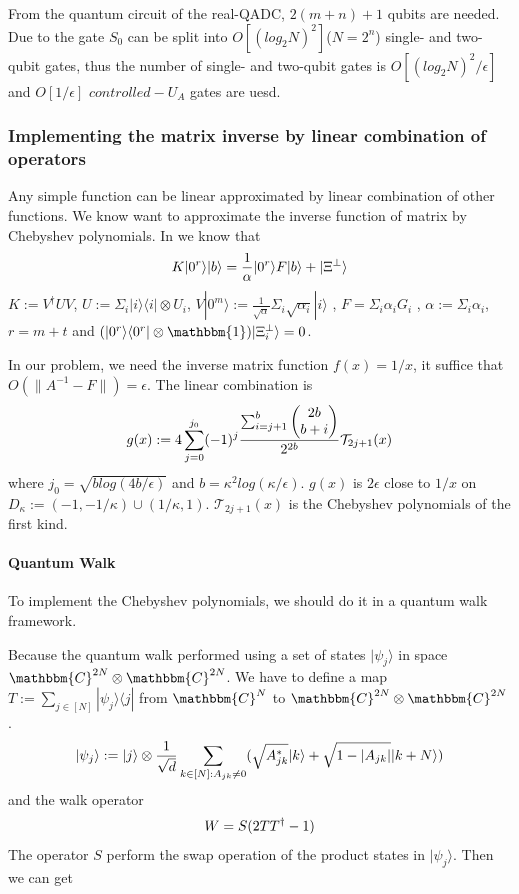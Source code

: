 \documentclass[%
 reprint,
 amsmath,amssymb,
pra,
]{revtex4-1}
\begin{document}
From the quantum circuit of the real-QADC, $2(m+n)+1$ qubits are needed. Due to the gate $S_0$ can be split into $O[(log_{2}N)^2]$($N=2^n$) 
single- and two-qubit gates\cite{barenco_elementary_1995}, thus the number of single- and two-qubit gates is $O[(log_{2}N)^2/{\epsilon}]$ and $O[1/{\epsilon}]$ $controlled-U_A$ gates are uesd\cite{mitarai_quantum_2019}.


\subsubsection{Implementing the matrix inverse by linear combination of operators}
Any simple function can be linear approximated by linear combination of other
functions. We know want to approximate the inverse function of matrix by
Chebyshev polynomials. In \cite{doi:10.1137/16M1087072} we know that 
\begin{equation}
\label{K}
K|0^r\rangle|b\rangle=\frac{1}{\alpha}|0^r\rangle F|b\rangle
+|\Xi^\bot \rangle\notag
\end{equation}
$K:=V^\dagger UV$, $U:=\Sigma_i|i\rangle\langle i|
\otimes U_i$, 
$V|0^m\rangle:=\frac{1}{\sqrt{\alpha}}\Sigma_i\sqrt{\alpha_i}|i\rangle$
, $F=\Sigma_i\alpha_iG_i$
, $\alpha:=\Sigma_i\alpha_i$, $r=m+t$ and 
$(|0^r\rangle\langle0^r|\otimes\mathbbm{1})|\Xi_i^\bot\rangle=0$.

In our problem, we need the inverse matrix function $f(x) = 1/x$, 
it suffice that $O(\lVert A^{-1}-F\rVert)=\epsilon$.
The linear combination\cite{doi:10.1137/16M1087072} is
\begin{equation}
g(x):=4\sum_{j=0}^{j_0}(-1)^j
\frac{\sum_{i=j+1}^{b}\begin{pmatrix}
2b\\b+i
\end{pmatrix}}{2^{2b}}\mathcal{T}_{2j+1}(x)\notag
\end{equation}
where $j_0=\sqrt{b log(4b/\epsilon)}$ and $b=\kappa^2log(\kappa/\epsilon)$.
$g(x)$ is $2\epsilon$ close to $1/x$ on $D_\kappa:=(-1,-1/\kappa)\cup
(1/\kappa,1)$.
$\mathcal{T}_{2j+1}(x)$ is the Chebyshev polynomials of the first kind.
\paragraph{Quantum Walk}
To implement the Chebyshev polynomials, we should do it in a quantum walk 
framework. 

Because the quantum walk performed using a set of states $|\psi_j\rangle$
in space $\mathbbm{C}^{2N}\otimes
\mathbbm{C}^{2N}$.
We have to define a map $T:=\sum_{j\in [N]}|\psi_j\rangle\langle j|$ from
$\mathbbm{C}^{N}$ to $\mathbbm{C}^{2N}\otimes\mathbbm{C}^{2N}$.
\begin{equation}
|\psi_j\rangle:=|j\rangle\otimes \frac{1}{\sqrt{d}}
\sum_{k\in [N]:A_{jk}\neq 0}(\sqrt{A^*_{jk}}|k\rangle+\sqrt{1-|A_{jk}|}|k+N
\rangle)\notag
\end{equation}
and the walk operator
\begin{equation}
W=S(2TT^\dagger-1)\notag
\end{equation}
The operator $S$ perform the swap operation of the product states in 
$|\psi_j\rangle$. Then we can get 
\end{document}
